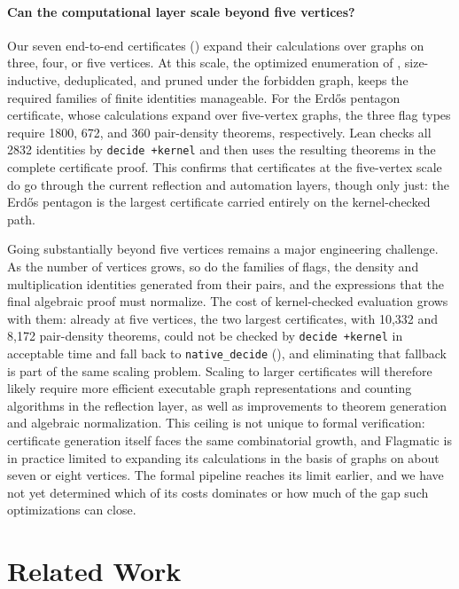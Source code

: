 \documentclass{article}
\newcommand{\lean}[1]{\texttt{#1}}
\begin{document}
\paragraph{Can the computational layer scale beyond five vertices?}
Our seven end-to-end certificates () expand their
calculations over graphs on three, four, or five vertices.  At this scale,
the optimized enumeration of , size-inductive,
deduplicated, and pruned under the forbidden graph, keeps the required
families of finite identities manageable.  For the Erd\H{o}s pentagon
certificate, whose calculations expand over five-vertex graphs, the three
flag types require 1800, 672, and 360 pair-density theorems, respectively.
Lean checks all 2832 identities by \lean{decide +kernel} and then uses the
resulting theorems in the complete certificate proof.  This confirms that
certificates at the five-vertex scale do go through the current reflection
and automation layers, though only just: the Erd\H{o}s pentagon is the
largest certificate carried entirely on the kernel-checked path.

Going substantially beyond five vertices remains a major engineering
challenge.  As the number of vertices grows, so do the families of flags,
the density and multiplication identities generated from their pairs, and the
expressions that the final algebraic proof must normalize.  The cost of
kernel-checked evaluation grows with them: already at five vertices, the two
largest certificates, with 10,332 and 8,172 pair-density theorems, could not
be checked by \lean{decide +kernel} in acceptable time and fall back to
\lean{native\_decide} (), and eliminating that
fallback is part of the same scaling problem.  Scaling to larger
certificates will therefore likely require more efficient executable graph
representations and counting algorithms in the reflection layer, as well as
improvements to theorem generation and algebraic normalization.  This
ceiling is not unique to formal verification: certificate generation itself
faces the same combinatorial growth, and Flagmatic is in practice limited to
expanding its calculations in the basis of graphs on about seven or eight
vertices.  The formal pipeline reaches its
limit earlier, and we have not yet determined which of its costs dominates
or how much of the gap such optimizations can close.


\section{Related Work}
\label{sec:related}
\end{document}
